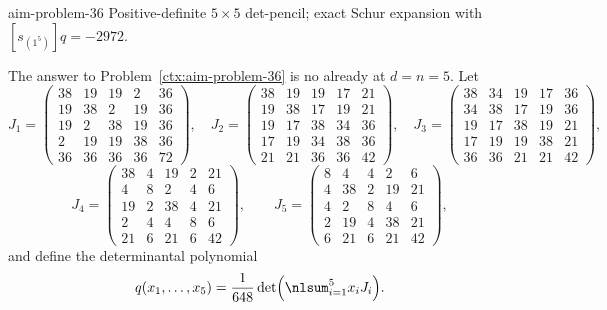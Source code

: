 \begin{cxcertificate}{aim-problem-36}
Positive-definite $5\times5$ det-pencil; exact Schur expansion with $[s_{(1^5)}]q=-2972$.
\end{cxcertificate}

\begin{cxrefutation}
The answer to Problem~\ref{ctx:aim-problem-36} is no already at $d=n=5$.  Let
\begingroup
\scriptsize
\[
J_1=
\begin{pmatrix}
38&19&19&2&36\\
19&38&2&19&36\\
19&2&38&19&36\\
2&19&19&38&36\\
36&36&36&36&72
\end{pmatrix},\quad
J_2=
\begin{pmatrix}
38&19&19&17&21\\
19&38&17&19&21\\
19&17&38&34&36\\
17&19&34&38&36\\
21&21&36&36&42
\end{pmatrix},\quad
J_3=
\begin{pmatrix}
38&34&19&17&36\\
34&38&17&19&36\\
19&17&38&19&21\\
17&19&19&38&21\\
36&36&21&21&42
\end{pmatrix},
\]
\[
J_4=
\begin{pmatrix}
38&4&19&2&21\\
4&8&2&4&6\\
19&2&38&4&21\\
2&4&4&8&6\\
21&6&21&6&42
\end{pmatrix},\qquad
J_5=
\begin{pmatrix}
8&4&4&2&6\\
4&38&2&19&21\\
4&2&8&4&6\\
2&19&4&38&21\\
6&21&6&21&42
\end{pmatrix},
\]
\endgroup
and define the determinantal polynomial
\begin{equation}\label{eq:aim36-q}
q(x_1,\ldots,x_5)=\frac1{648}\det\Bigl(\nlsum_{i=1}^5x_iJ_i\Bigr).
\end{equation}


\end{cxrefutation}
